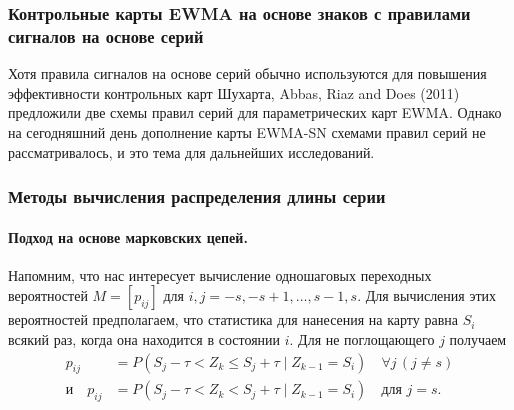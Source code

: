 \subsubsection{Контрольные карты EWMA на основе знаков с правилами сигналов на основе серий}
Хотя правила сигналов на основе серий обычно используются для повышения эффективности контрольных карт Шухарта, Abbas, Riaz and Does (2011) предложили две схемы правил серий для параметрических карт EWMA. Однако на сегодняшний день дополнение карты EWMA-SN схемами правил серий не рассматривалось, и это тема для дальнейших исследований.

\subsubsection{Методы вычисления распределения длины серии}
\paragraph{Подход на основе марковских цепей.} Напомним, что нас интересует вычисление одношаговых переходных вероятностей \(M = [p_{ij}]\) для \(i, j = -s, -s + 1, \ldots, s - 1, s\). Для вычисления этих вероятностей предполагаем, что статистика для нанесения на карту равна \(S_i\) всякий раз, когда она находится в состоянии \(i\). Для не поглощающего \(j\) получаем
\begin{equation}
	\begin{aligned}
		p_{ij} &= P(S_j - \tau < Z_k \le S_j + \tau \mid Z_{k-1} = S_i) \quad \forall j\, (j \ne s) \\
		\text{и}\quad p_{ij} &= P(S_j - \tau < Z_k < S_j + \tau \mid Z_{k-1} = S_i) \quad \text{для } j = s.
	\end{aligned}
	\label{eq:4.18}
\end{equation}

